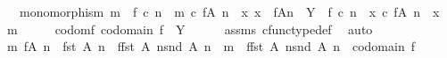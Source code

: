 \begin{isabellebody}
\ \ \ \ monomorphism\ m\ {\isasymand}\ f\ {\isasymcirc}\isactrlsub c\ n\ {\isacharequal}{\kern0pt}\ m\ {\isasymcirc}\isactrlsub c\ {\isacharparenleft}{\kern0pt}f{\isasymrestriction}\isactrlbsub {\isacharparenleft}{\kern0pt}A{\isacharcomma}{\kern0pt}\ n{\isacharparenright}{\kern0pt}\isactrlesub {\isacharparenright}{\kern0pt}\ {\isasymand}\ {\isacharparenleft}{\kern0pt}{\isasymforall}x{\isachardot}{\kern0pt}\ x\ {\isacharcolon}{\kern0pt}\ f{\isasymlparr}A{\isasymrparr}\isactrlbsub n\isactrlesub \ {\isasymrightarrow}\ Y\ {\isasymlongrightarrow}\ f\ {\isasymcirc}\isactrlsub c\ n\ {\isacharequal}{\kern0pt}\ x\ {\isasymcirc}\isactrlsub c\ {\isacharparenleft}{\kern0pt}f{\isasymrestriction}\isactrlbsub {\isacharparenleft}{\kern0pt}A{\isacharcomma}{\kern0pt}\ n{\isacharparenright}{\kern0pt}\isactrlesub {\isacharparenright}{\kern0pt}\ {\isasymlongrightarrow}\ x\ {\isacharequal}{\kern0pt}\ m{\isacharparenright}{\kern0pt}{\isachardoublequoteclose}\isanewline
%
\isadelimproof
%
\endisadelimproof
%
\isatagproof
{}\isamarkupfalse%
\ {\isacharminus}{\kern0pt}\isanewline
\ \ \isamarkupfalse%
\ codom{\isacharunderscore}{\kern0pt}f{\isacharcolon}{\kern0pt}\ {\isachardoublequoteopen}codomain\ f\ {\isacharequal}{\kern0pt}\ Y{\isachardoublequoteclose}\isanewline
\ \ \ \ \isamarkupfalse%
\ assms{\isacharparenleft}{\kern0pt}{}{\isacharparenright}{\kern0pt}\ cfunc{\isacharunderscore}{\kern0pt}type{\isacharunderscore}{\kern0pt}def\ \isamarkupfalse%
\ auto\isanewline
\ \ \isamarkupfalse%
\ {\isachardoublequoteopen}{\isasymexists}\ m{\isachardot}{\kern0pt}\ f{\isasymrestriction}\isactrlbsub {\isacharparenleft}{\kern0pt}A{\isacharcomma}{\kern0pt}\ n{\isacharparenright}{\kern0pt}\isactrlesub \ {\isacharcolon}{\kern0pt}\ fst\ {\isacharparenleft}{\kern0pt}A{\isacharcomma}{\kern0pt}\ n{\isacharparenright}{\kern0pt}\ {\isasymrightarrow}\ f{\isasymlparr}fst\ {\isacharparenleft}{\kern0pt}A{\isacharcomma}{\kern0pt}\ n{\isacharparenright}{\kern0pt}{\isasymrparr}\isactrlbsub snd\ {\isacharparenleft}{\kern0pt}A{\isacharcomma}{\kern0pt}\ n{\isacharparenright}{\kern0pt}\isactrlesub \ {\isasymand}\ m\ {\isacharcolon}{\kern0pt}\ f{\isasymlparr}fst\ {\isacharparenleft}{\kern0pt}A{\isacharcomma}{\kern0pt}\ n{\isacharparenright}{\kern0pt}{\isasymrparr}\isactrlbsub snd\ {\isacharparenleft}{\kern0pt}A{\isacharcomma}{\kern0pt}\ n{\isacharparenright}{\kern0pt}\isactrlesub \ {\isasymrightarrow}\ codomain\ f\ {\isasymand}\isanewline

\end{isabellebody}
